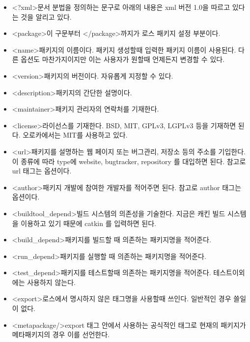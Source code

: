 

\begin{itemize}
\item \textless{?xml}\textgreater 문서 분법을 정의하는 문구로 아래의 내용은 xml 버전 1.0을 따르고 있다는 것을 알리고 있다.
\item \textless{package}\textgreater 이 구문부터 \textless/package\textgreater 까지가 로스 패키지 설정 부분이다.
\item \textless{name}\textgreater 패키지의 이름이다. 패키지 생성할때 입력한 패키지 이름이 사용된다. 다른 옵션도 마찬가지이지만 이는 사용자가 원할때 언제든지 변경할 수 있다.
\item \textless{version}\textgreater 패키지의 버전이다. 자유롭게 지정할 수 있다.
\item \textless{description}\textgreater 패키지의 간단한 설명이다. 
\item \textless{maintainer}\textgreater 패키지 관리자의 연락처를 기재한다.
\item \textless{license}\textgreater 라이선스를 기재한다. BSD, MIT, GPLv3, LGPLv3 등을 기재하면 된다. 오로카에서는 MIT를 사용하고 있다.
\item \textless{url}\textgreater 패키지를 설명하는 웹 페이지 또는 버그관리, 저장소 등의 주소를 기입한다. 이 종류에 따라 type에  website, bugtracker, repository 를 대입하면 된다. 참고로 url 태그는 옵션이다.
\item \textless{author}\textgreater 패키지 개발에 참여한 개발자를 적어주면 된다. 참고로 author 태그는 옵션이다.
\item \textless{buildtool\_depend}\textgreater 빌드 시스템의 의존성을 기술한다. 지금은 캐킨 빌드 시스템을 이용하고 있기 때문에 catkin 를 입력하면 된다.
\item \textless{build\_depend}\textgreater 패키지를 빌드할 때 의존하는 패키지명을 적어준다.
\item \textless{run\_depend}\textgreater 패키지를 실행할 때 의존하는 패키지명을 적어준다.
\item \textless{test\_depend}\textgreater 패키지를 테스트할때 의존하는 패키지명을 적어준다. 테스트이외에는 사용하지 않는다.
\item \textless{export}\textgreater 로스에서 명시하지 않은 태그명을 사용할때 쓰인다. 일반적인 경우 쓸일이 없다.
\item \textless{metapackage/}\textgreater export 태그 안에서 사용하는 공식적인 태그로 현재의 패키지가 메타패키지의 경우 이를 선언한다.
\end{itemize}

